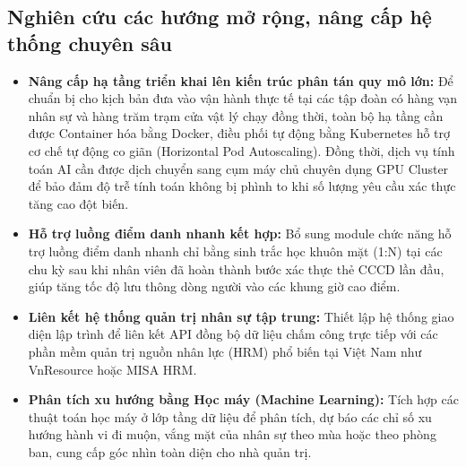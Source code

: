 \documentclass[../DoAn.tex]{subfiles}
\begin{document}
\subsection{Nghiên cứu các hướng mở rộng, nâng cấp hệ thống chuyên sâu}
\begin{itemize}
    \item \textbf{Nâng cấp hạ tầng triển khai lên kiến trúc phân tán quy mô lớn:} Để chuẩn bị cho kịch bản đưa vào vận hành thực tế tại các tập đoàn có hàng vạn nhân sự và hàng trăm trạm cửa vật lý chạy đồng thời, toàn bộ hạ tầng cần được Container hóa bằng Docker, điều phối tự động bằng Kubernetes hỗ trợ cơ chế tự động co giãn (Horizontal Pod Autoscaling). Đồng thời, dịch vụ tính toán AI cần được dịch chuyển sang cụm máy chủ chuyên dụng GPU Cluster để bảo đảm độ trễ tính toán không bị phình to khi số lượng yêu cầu xác thực tăng cao đột biến.
    \item \textbf{Hỗ trợ luồng điểm danh nhanh kết hợp:} Bổ sung module chức năng hỗ trợ luồng điểm danh nhanh chỉ bằng sinh trắc học khuôn mặt (1:N) tại các chu kỳ sau khi nhân viên đã hoàn thành bước xác thực thẻ CCCD lần đầu, giúp tăng tốc độ lưu thông dòng người vào các khung giờ cao điểm.
    \item \textbf{Liên kết hệ thống quản trị nhân sự tập trung:} Thiết lập hệ thống giao diện lập trình để liên kết API đồng bộ dữ liệu chấm công trực tiếp với các phần mềm quản trị nguồn nhân lực (HRM) phổ biến tại Việt Nam như VnResource hoặc MISA HRM.
    \item \textbf{Phân tích xu hướng bằng Học máy (Machine Learning):} Tích hợp các thuật toán học máy ở lớp tầng dữ liệu để phân tích, dự báo các chỉ số xu hướng hành vi đi muộn, vắng mặt của nhân sự theo mùa hoặc theo phòng ban, cung cấp góc nhìn toàn diện cho nhà quản trị.
\end{itemize}
\end{document}
